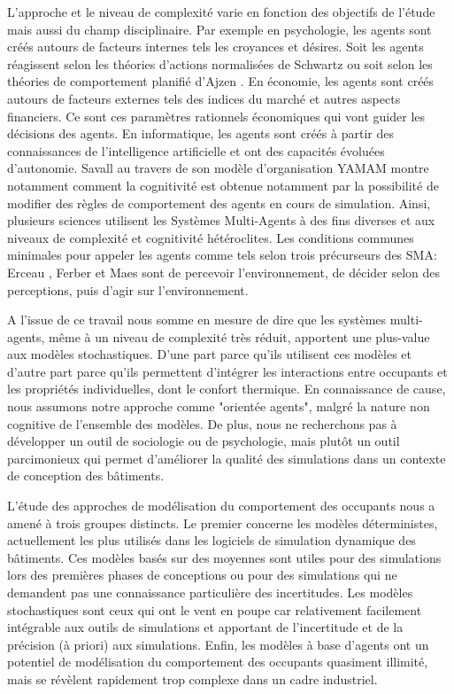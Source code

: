 L'approche et le niveau de complexité varie en fonction des objectifs de l'étude mais aussi du champ disciplinaire. Par exemple en psychologie, les agents sont créés autours de facteurs internes tels les croyances et désires. Soit les agents réagissent selon les théories d'actions normalisées de Schwartz \cite{Schwartz-77} ou soit selon les théories de comportement planifié d'Ajzen \cite{Ajzen-91}. En économie, les agents sont créés autours de facteurs externes tels des indices du marché et autres aspects financiers. Ce sont ces paramètres rationnels économiques qui vont guider les décisions des agents. En informatique, les agents sont créés à partir des connaissances de l'intelligence artificielle et ont des capacités évoluées d'autonomie. Savall \cite{Savall-03} au travers de son modèle d'organisation YAMAM montre notamment comment la cognitivité est obtenue notamment par la possibilité de modifier des règles de comportement des agents en cours de simulation. Ainsi, plusieurs sciences utilisent les Systèmes Multi-Agents à des fins diverses et aux niveaux de complexité et cognitivité hétéroclites. Les conditions communes minimales pour appeler les agents comme tels selon trois précurseurs des SMA: Erceau \cite{Erceau-93}, Ferber \cite{Ferber-95} et Maes \cite{Maes-95} sont de percevoir l'environnement, de décider selon des perceptions, puis d'agir sur l'environnement.

A l'issue de ce travail nous somme en mesure de dire que les systèmes multi-agents, même à un niveau de complexité très réduit, apportent une plus-value aux modèles stochastiques. D'une part parce qu'ils utilisent ces modèles et d'autre part parce qu'ils permettent d'intégrer les interactions entre occupants et les propriétés individuelles, dont le confort thermique. En connaissance de cause, nous assumons notre approche comme "orientée agents", malgré la nature non cognitive de l'ensemble des modèles. De plus, nous ne recherchons pas à développer un outil de sociologie ou de psychologie, mais plutôt un outil parcimonieux qui permet d'améliorer la qualité des simulations dans un contexte de conception des bâtiments.

L'étude des approches de modélisation du comportement des occupants nous a amené à trois groupes distincts. Le premier concerne les modèles déterministes, actuellement les plus utilisés dans les logiciels de simulation dynamique des bâtiments. Ces modèles basés sur des moyennes sont utiles pour des simulations lors des premières phases de conceptions ou pour des simulations qui ne demandent pas une connaissance particulière des incertitudes. Les modèles stochastiques sont ceux qui ont le vent en poupe car relativement facilement intégrable aux outils de simulations et apportant de l'incertitude  et de la précision (à priori) aux simulations. Enfin, les modèles à base d'agents ont un potentiel de modélisation du comportement des occupants quasiment illimité, mais se révèlent rapidement trop complexe dans un cadre industriel.

